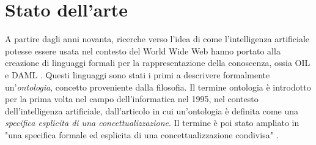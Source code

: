 \chapter[Stato dell'arte]{Stato dell'arte}
\label{chap:State-of-art}
A partire dagli anni novanta, ricerche verso l'idea di come l'intelligenza artificiale potesse essere usata nel contesto del World Wide Web hanno portato alla creazione di linguaggi formali per la rappresentazione della conoscenza, ossia OIL \cite{Horrocks2000TheOI} e DAML \cite{hendler2000darpa}. Questi linguaggi sono stati i primi a descrivere formalmente un'\textit{ontologia}, concetto proveniente dalla filosofia. Il termine ontologia è introdotto per la prima volta nel campo dell'informatica nel 1995, nel contesto dell'intelligenza artificiale, dall'articolo \cite{gruber1995} in cui un'ontologia è definita come una \textit{specifica esplicita di una concettualizzazione}. Il termine è poi stato ampliato in "una specifica formale ed esplicita di una concettualizzazione condivisa" \cite{goy2015ontologies}. 

